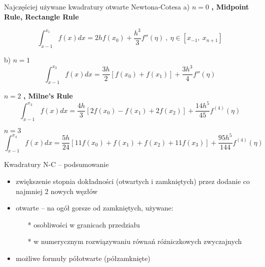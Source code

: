 	\begin{frame}{Najczęściej używane kwadratury otwarte Newtona-Cotesa}
a) $n=0$ \textbf{, Midpoint Rule, Rectangle Rule}

		$$
\int_{x-1}^{x_{1}}f(x)dx=2hf(x_{0})+\frac{h^{3}}{3}f''(\eta)\ ,\ \eta\in[x_{-1},\ x_{n+1}]
		$$

b) $n=1$
		$$
\int_{x-1}^{x_{2}}f(x)dx=\frac{3h}{2}[f(x_{0})+f(x_{1})]+\frac{3h^{3}}{4}f''(\eta)
		$$

$n=2$ \textbf{, Milne's Rule}
		$$
\int_{x-1}^{x_{3}}f(x)dx=\frac{4h}{3}[2f(x_{0})-f(x_{1})+2f(x_{2})]+\frac{14h^{5}}{45}f^{(4)}(\eta)
		$$

$n=3$
		$$
\int_{x-1}^{x_{4}}f(x)dx=\frac{5h}{24} [11f(x_{0})+f(x_{1})+f(x_{2})+11f(x_{3})]+ \frac{95h^{5}}{144}f^{(4)}(\eta)
		$$
	\end{frame}
	\begin{frame}{Kwadratury N-C -- podsumowanie}
    \begin{itemize}
    	\item zwiększenie stopnia dokładności (otwartych i zamkniętych) przez dodanie co najmniej 2 nowych węzłów
    	\item otwarte -- na ogół gorsze od zamkniętych, używane:
    		\begin{itemize}
    			\item[*] osobliwości w granicach przedziału
    			\item[*] w numerycznym rozwiązywaniu równań różniczkowych zwyczajnych
    		\end{itemize}
   	 	\item możliwe formuły półotwarte (półzamknięte)
    	\end{itemize}
	\end{frame}
